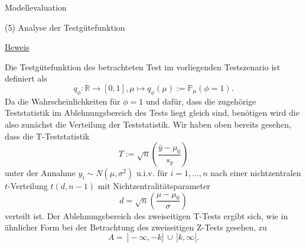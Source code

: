 \documentclass[
  8pt,
  ignorenonframetext,
]{beamer}
\begin{document}
\begin{frame}{Modellevaluation}
\protect\hypertarget{modellevaluation-9}{}

\noindent (5) Analyse der Testgütefunktion

\footnotesize

\underline{Beweis}

Die Testgütefunktion des betrachteten Test im vorliegenden Testszenario
ist definiert als \begin{equation}
q_{\phi} : \mathbb{R} \to [0,1],
\mu \mapsto q_{\phi}(\mu) := \mathbb{P}_{\mu}(\phi = 1).
\end{equation} Da die Wahrscheinlichkeiten für \(\phi = 1\) und dafür,
dass die zugehörige Teststatistik im Ablehnungsbereich des Tests liegt
gleich sind, benötigen wird die also zunächst die Verteilung der
Teststatistik. Wir haben oben bereits gesehen, dass die T-Teststatistik
\begin{equation}
T := \sqrt{n}\left(\frac{\bar{y} - \mu_0}{s_y} \right)
\end{equation} unter der Annahme
\(y_i \sim N(\mu,\sigma^2) \mbox{ u.i.v. für } i = 1,...,n\) nach einer
nichtzentralen \(t\)-Verteilung \(t(d,n-1)\) mit
Nichtzentralitätsparameter \begin{equation}
d = \sqrt{n}\left(\frac{\mu - \mu_0}{\sigma}\right)
\end{equation} verteilt ist. Der Ablehnungsbereich des zweiseitigen
T-Tests ergibt sich, wie in ähnlicher Form bei der Betrachtung des
zweiseitigen Z-Tests gesehen, zu \begin{equation}
A  = \,]-\infty, -k]\, \cup \,]k,\infty[.
\end{equation} \vfill
\end{frame}
\end{document}
